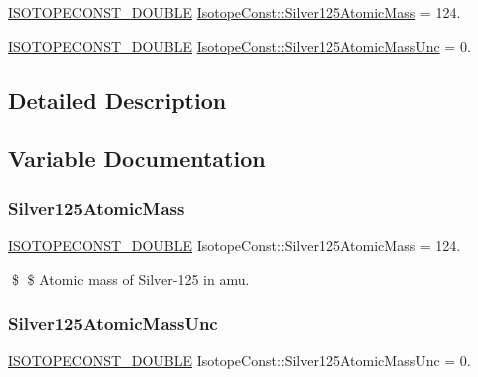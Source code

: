 \begin{DoxyCompactItemize}
\item 
\mbox{\hyperlink{group___isotope_const-_macros_ga8f45a7272ce02c0b4c65c44636ed719a}{I\+S\+O\+T\+O\+P\+E\+C\+O\+N\+S\+T\+\_\+\+D\+O\+U\+B\+LE}} \mbox{\hyperlink{group___isotope_const-_silver-_ag125_gae2663c0d3b8ef98cb5d0396434fd7918}{Isotope\+Const\+::\+Silver125\+Atomic\+Mass}} = 124.
\item 
\mbox{\hyperlink{group___isotope_const-_macros_ga8f45a7272ce02c0b4c65c44636ed719a}{I\+S\+O\+T\+O\+P\+E\+C\+O\+N\+S\+T\+\_\+\+D\+O\+U\+B\+LE}} \mbox{\hyperlink{group___isotope_const-_silver-_ag125_ga75c015e31fed1c305c459d2d8818cc2a}{Isotope\+Const\+::\+Silver125\+Atomic\+Mass\+Unc}} = 0.
\end{DoxyCompactItemize}


\subsection{Detailed Description}


\subsection{Variable Documentation}
\mbox{\label{group___isotope_const-_silver-_ag125_gae2663c0d3b8ef98cb5d0396434fd7918}} 
\subsubsection{\texorpdfstring{Silver125\+Atomic\+Mass}{Silver125AtomicMass}}
{\footnotesize\ttfamily \mbox{\hyperlink{group___isotope_const-_macros_ga8f45a7272ce02c0b4c65c44636ed719a}{I\+S\+O\+T\+O\+P\+E\+C\+O\+N\+S\+T\+\_\+\+D\+O\+U\+B\+LE}} Isotope\+Const\+::\+Silver125\+Atomic\+Mass = 124.}

\$ \$ Atomic mass of Silver-\/125 in amu. \mbox{\label{group___isotope_const-_silver-_ag125_ga75c015e31fed1c305c459d2d8818cc2a}} 
\subsubsection{\texorpdfstring{Silver125\+Atomic\+Mass\+Unc}{Silver125AtomicMassUnc}}
{\footnotesize\ttfamily \mbox{\hyperlink{group___isotope_const-_macros_ga8f45a7272ce02c0b4c65c44636ed719a}{I\+S\+O\+T\+O\+P\+E\+C\+O\+N\+S\+T\+\_\+\+D\+O\+U\+B\+LE}} Isotope\+Const\+::\+Silver125\+Atomic\+Mass\+Unc = 0.}

